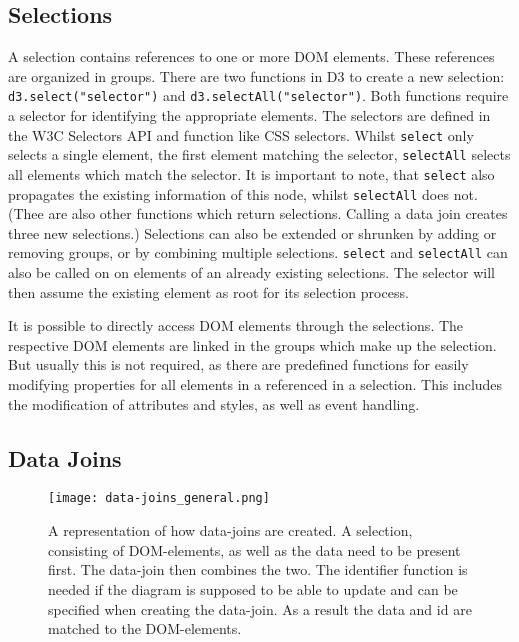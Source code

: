 \subsection{Selections}


A selection contains references to one or more DOM elements. These references are organized in groups. There are two functions in D3 to create a new selection: \verb|d3.select("selector")| and \verb|d3.selectAll("selector")|. Both functions require a selector for identifying the appropriate elements. The selectors are defined in the W3C Selectors API\cite{w3c_selectors_api} and function like CSS selectors. Whilst \verb|select| only selects a single element, the first element matching the selector, \verb|selectAll| selects all elements which match the selector. It is important to note, that \verb|select| also propagates the existing information of this node, whilst \verb|selectAll| does not. (Thee are also other functions which return selections. Calling a data join creates three new selections.) Selections can also be extended or shrunken by adding or removing groups, or by combining multiple selections. \verb|select| and \verb|selectAll| can also be called on on elements of an already existing selections. The selector will then assume the existing element as root for its selection process.

It is possible to directly access DOM elements through the selections. The respective DOM elements are linked in the groups which make up the selection. But usually this is not required, as there are predefined functions for easily modifying properties for all elements in a referenced in a selection. This includes the modification of attributes and styles, as well as event handling. 

\subsection{Data Joins}

\begin{figure}
    \texttt{[image: data-joins\_general.png]}
    \captionsetup{width=0.9\textwidth}
    \caption[data-joins]{A representation of how data-joins are created. A selection, consisting of DOM-elements, as well as the data need to be present first. The data-join then combines the two. The identifier function is needed if the diagram is supposed to be able to update and can be specified when creating the data-join. As a result the data and id are matched to the DOM-elements.}
    \label{fig:data-joins}
\end{figure}


